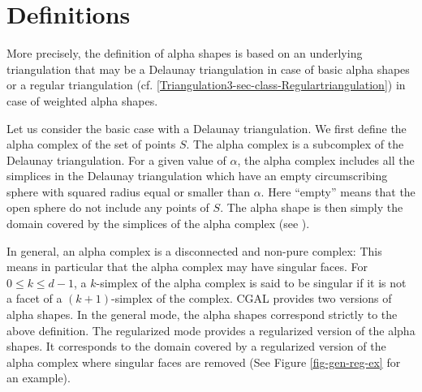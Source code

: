 \section{Definitions}


More precisely, the definition of alpha shapes is based on an underlying
triangulation that may be a Delaunay triangulation 
in case of basic alpha shapes 
or a regular triangulation 
(cf. \ref{Triangulation3-sec-class-Regulartriangulation})
in case of weighted alpha shapes.

Let us consider the basic case with a Delaunay triangulation.
We first define the alpha complex  of the set of points $S$. 
The  alpha complex is a subcomplex 
of the Delaunay triangulation.
For a given value of $\alpha$, the alpha complex includes
all the simplices in the Delaunay triangulation which have
an empty  circumscribing sphere with squared radius equal or smaller than $\alpha$.
Here ``empty'' means  that the open sphere 
do not include  any points of $S$.
The alpha shape is then simply the domain covered by the simplices
of the alpha complex (see \cite{em-tdas-94}).

In general, an alpha complex is a disconnected and non-pure complex:
This means in particular that the alpha complex may have
singular faces.  For $0 \leq k \leq d-1$,
a $k$-simplex of the alpha complex  is said to be
singular if it is not a facet of a $(k+1)$-simplex of the complex.
CGAL provides two versions of alpha shapes. In the general mode,
the alpha shapes correspond strictly to the above definition.
The regularized mode provides a regularized version of the alpha shapes.
It corresponds to the domain covered by a regularized version
of the alpha complex where singular faces are removed 
(See Figure \ref{fig-gen-reg-ex} for an example).


